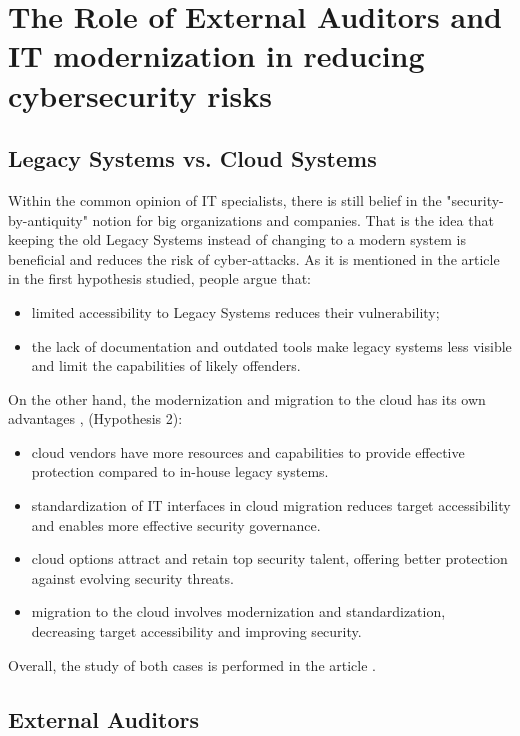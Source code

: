 \documentclass[journal]{IEEEtran}
\begin{document}
\section{The Role of External Auditors and IT modernization in reducing cybersecurity risks}

\subsection{Legacy Systems vs. Cloud Systems}

Within the common opinion of IT specialists, there is still belief in the "security-by-antiquity" notion for big organizations and companies. That is the idea that keeping the old Legacy Systems instead of changing to a modern system is beneficial and reduces the risk of cyber-attacks. As it is mentioned in the article \cite{bastos_1} in the first hypothesis studied, people argue that: 

\begin{itemize}
    \item limited accessibility to Legacy Systems reduces their vulnerability;
    \item the lack of documentation and outdated tools make legacy systems less visible and limit the capabilities of likely offenders.
\end{itemize}

On the other hand, the modernization and migration to the cloud has its own advantages \cite{bastos_1}, (Hypothesis 2):  

\begin{itemize}
    \item cloud vendors have more resources and capabilities to provide effective protection compared to in-house legacy systems.
    \item standardization of IT interfaces in cloud migration reduces target accessibility and enables more effective security governance.
    \item cloud options attract and retain top security talent, offering better protection against evolving security threats.
    \item migration to the cloud involves modernization and standardization, decreasing target accessibility and improving security.
\end{itemize}

Overall, the study of both cases is performed in the article \cite{bastos_1}. 


\subsection{External Auditors}
\end{document}
